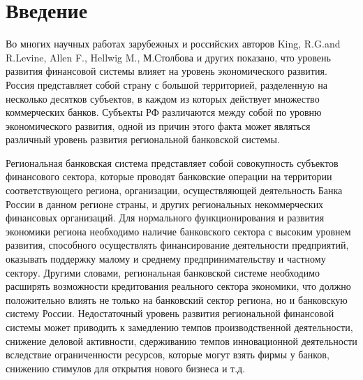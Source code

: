 
	\chapter*{Введение}

Во многих научных работах зарубежных и российских авторов King, R.G.and  R.Levine, Allen F., Hellwig M., М.Столбова и других показано, что уровень развития финансовой системы влияет на уровень экономического развития. Россия представляет собой страну с большой территорией, разделенную на несколько десятков субъектов, в каждом из которых действует множество коммерческих банков. Субъекты РФ различаются между собой по уровню экономического развития, одной из причин этого факта может являться различный уровень развития региональной банковской системы.

Региональная банковская система представляет собой совокупность субъектов финансового сектора, которые проводят банковские операции на территории соответствующего региона, организации, осуществляющей деятельность Банка России в данном регионе страны, и других региональных некоммерческих финансовых организаций. Для нормального функционирования и развития экономики региона необходимо наличие банковского сектора с высоким уровнем развития, способного осуществлять финансирование деятельности предприятий, оказывать поддержку малому и среднему предпринимательству и частному сектору. Другими словами, региональная банковской системе необходимо расширять возможности кредитования реального сектора экономики, что должно положительно влиять не только на банковский сектор региона, но и  банковскую систему России. Недостаточный уровень развития региональной финансовой системы может приводить к замедлению темпов производственной деятельности, снижение деловой активности, сдерживанию темпов инновационной деятельности вследствие ограниченности ресурсов, которые могут взять фирмы у банков, снижению стимулов для открытия нового бизнеса и т.д. 

